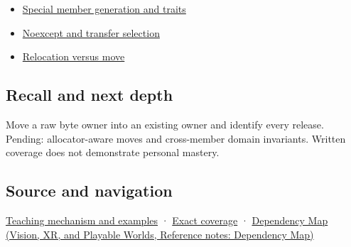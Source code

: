 \begin{itemize}
\tightlist
\item
  \hyperref[appendix-42e02a12c694]{Special member generation and traits}
\item
  \hyperref[appendix-c746afaa47d1]{Noexcept and transfer selection}
\item
  \hyperref[appendix-adfd6397af8d]{Relocation versus move}
\end{itemize}

\subsection{Recall and next depth}\label{appendix-5636651017c2-recall-and-next-depth}

Move a raw byte owner into an existing owner and identify every release. Pending: allocator-aware moves and cross-member domain invariants. Written coverage does not demonstrate personal mastery.

\subsection{Source and navigation}\label{appendix-5636651017c2-source-and-navigation}

\hyperref[01-foundations-i-ch003-a-move-transfers-responsibility-while-the-source-survives]{Teaching mechanism and examples} · \hyperref[appendix-fd090d982a15-m009---parts-127-147]{Exact coverage} · \href{../07-Vision-XR-and-Playable-Worlds/main.pdf\#nameddest=appendix-4ad47bdd269a}{Dependency Map (Vision, XR, and Playable Worlds, Reference notes: Dependency Map)}
